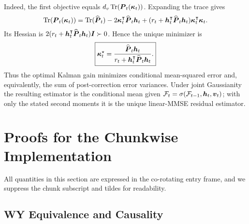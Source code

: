 \documentclass[11pt,letterpaper,logo]{yalearxiv}
\begin{document}
Indeed, the first objective equals
$d_v\operatorname{Tr}(\boldsymbol{P}_t(\boldsymbol{\kappa}_t))$. Expanding the trace gives
\begin{equation}
\begin{aligned}
  \operatorname{Tr}(\boldsymbol{P}_t(\boldsymbol{\kappa}_t))
  =
  \operatorname{Tr}(\widehat{\boldsymbol{P}}_t)
  -2\boldsymbol{\kappa}_t^{\intercal}\widehat{\boldsymbol{P}}_t\boldsymbol{h}_t
  +
  (r_t+\boldsymbol{h}_t^{\intercal}\widehat{\boldsymbol{P}}_t\boldsymbol{h}_t)
  \boldsymbol{\kappa}_t^{\intercal}\boldsymbol{\kappa}_t.
\end{aligned}
\label{eq:app-kdn2-trace-expanded}
\end{equation}
Its Hessian is
$2(r_t+\boldsymbol{h}_t^{\intercal}\widehat{\boldsymbol{P}}_t\boldsymbol{h}_t)\boldsymbol{I}\succ0$. Hence the unique minimizer is
\begin{equation}
  \boxed{
  \boldsymbol{\kappa}_t^\star
  =
  \frac{\widehat{\boldsymbol{P}}_t\boldsymbol{h}_t}
  {r_t+\boldsymbol{h}_t^{\intercal}\widehat{\boldsymbol{P}}_t\boldsymbol{h}_t}.}
  \label{eq:app-kdn2-optimal-gain}
\end{equation}
Thus the optimal Kalman gain minimizes conditional mean-squared error and, equivalently, the sum
of post-correction error variances. Under joint Gaussianity the resulting estimator is the
conditional mean given
$\mathcal F_t=\sigma(\mathcal F_{t-1},\boldsymbol{h}_t,\boldsymbol{v}_t)$; with only the stated second moments it is the
unique linear-MMSE residual estimator.


\section{Proofs for the Chunkwise Implementation}
\label{app:kdn2-proofs}

All quantities in this section are expressed in the co-rotating entry frame, and we suppress the
chunk subscript and tildes for readability.

\subsection{WY Equivalence and Causality}
\label{app:kdn2-wy-proof}
\end{document}
